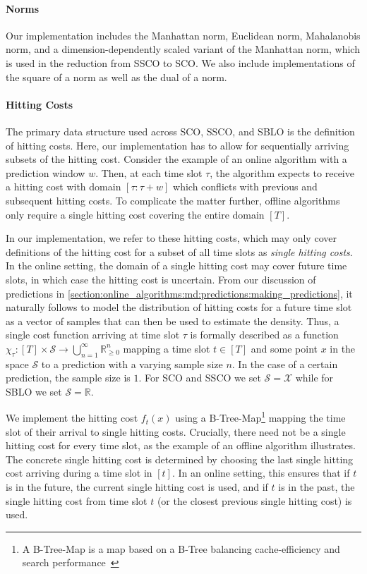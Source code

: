 \paragraph{Norms} Our implementation includes the Manhattan norm, Euclidean norm, Mahalanobis norm, and a dimension-dependently scaled variant of the Manhattan norm, which is used in the reduction from SSCO to SCO. We also include implementations of the square of a norm as well as the dual of a norm.

\paragraph{Hitting Costs} The primary data structure used across SCO, SSCO, and SBLO is the definition of hitting costs. Here, our implementation has to allow for sequentially arriving subsets of the hitting cost. Consider the example of an online algorithm with a prediction window $w$. Then, at each time slot $\tau$, the algorithm expects to receive a hitting cost with domain $[\tau : \tau + w]$ which conflicts with previous and subsequent hitting costs. To complicate the matter further, offline algorithms only require a single hitting cost covering the entire domain $[T]$.

In our implementation, we refer to these hitting costs, which may only cover definitions of the hitting cost for a subset of all time slots as \emph{single hitting costs}. In the online setting, the domain of a single hitting cost may cover future time slots, in which case the hitting cost is uncertain. From our discussion of predictions in \cref{section:online_algorithms:md:predictions:making_predictions}, it naturally follows to model the distribution of hitting costs for a future time slot as a vector of samples that can then be used to estimate the density. Thus, a single cost function arriving at time slot $\tau$ is formally described as a function $\chi_{\tau} : [T] \times \mathcal{S} \to \bigcup_{n=1}^{\infty} \mathbb{R}_{\geq 0}^n$ mapping a time slot $t \in [T]$ and some point $x$ in the space $\mathcal{S}$ to a prediction with a varying sample size $n$. In the case of a certain prediction, the sample size is $1$. For SCO and SSCO we set $\mathcal{S} = \mathcal{X}$ while for SBLO we set $\mathcal{S} = \mathbb{R}$.

We implement the hitting cost $f_t(x)$ using a B-Tree-Map\footnote{A B-Tree-Map is a map based on a B-Tree balancing cache-efficiency and search performance~\cite{BTreeMap}} mapping the time slot of their arrival to single hitting costs. Crucially, there need not be a single hitting cost for every time slot, as the example of an offline algorithm illustrates. The concrete single hitting cost is determined by choosing the last single hitting cost arriving during a time slot in $[t]$. In an online setting, this ensures that if $t$ is in the future, the current single hitting cost is used, and if $t$ is in the past, the single hitting cost from time slot $t$ (or the closest previous single hitting cost) is used.

